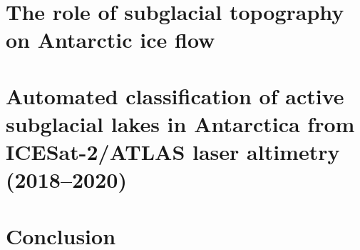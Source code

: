 \documentclass[12pt,twoside]{book}
\begin{document}
\chapter{The role of subglacial topography on Antarctic ice flow}
\label{ch:3}


\chapter{Automated classification of active subglacial lakes in Antarctica from ICESat-2/ATLAS laser altimetry (2018--2020)}
\label{ch:4}


\chapter{Conclusion}


\appendix


\printbibliography
\end{document}
